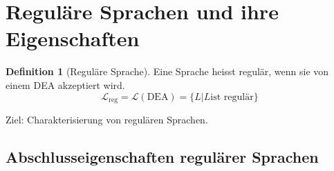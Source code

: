 \documentclass[11pt]{article} %
\theoremstyle{definition}
\newtheorem{definition}{Definition}
\begin{document}
\section{Reguläre Sprachen und ihre Eigenschaften}

\begin{definition}[Reguläre Sprache]
Eine Sprache heisst regulär, wenn sie von einem DEA akzeptiert wird.
\[
\mathcal{L}_{\textrm{reg}} = \mathcal{L}(\textrm{DEA}) = \{ L | L \textrm{ist regulär} \}
\]
\end{definition}

Ziel: Charakterisierung von regulären Sprachen.

\subsection{Abschlusseigenschaften regulärer Sprachen}
\end{document}

